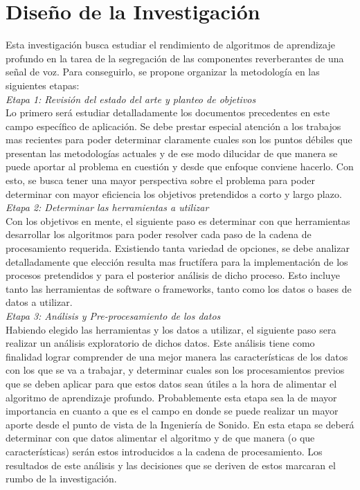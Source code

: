 \section{Diseño de la Investigación}
Esta investigación busca estudiar el rendimiento de algoritmos de aprendizaje profundo en la tarea de la segregación de las componentes reverberantes de una señal de voz. Para conseguirlo, se propone organizar la metodología en las siguientes etapas:\\

\textit{Etapa 1: Revisión del estado del arte y planteo de objetivos} \\
Lo primero será estudiar detalladamente los documentos precedentes en este campo específico de aplicación. Se debe prestar especial atención a los trabajos mas recientes para poder determinar claramente cuales son los puntos débiles que presentan las metodologías actuales y de ese modo dilucidar de que manera se puede aportar al problema en cuestión y desde que enfoque conviene hacerlo. Con esto, se busca tener una mayor perspectiva sobre el problema para poder determinar con mayor eficiencia los objetivos pretendidos a corto y largo plazo. \\

\textit{Etapa 2: Determinar las herramientas a utilizar} \\
Con los objetivos en mente, el siguiente paso es determinar con que herramientas desarrollar los algoritmos para poder resolver cada paso de la cadena de procesamiento requerida. Existiendo tanta variedad de opciones, se debe analizar detalladamente que elección resulta mas fructífera para la implementación de los procesos pretendidos y para el posterior análisis de dicho proceso. Esto incluye tanto las herramientas de software o frameworks, tanto como los datos o bases de datos a utilizar. \\

\textit{Etapa 3: Análisis y Pre-procesamiento de los datos} \\
Habiendo elegido las herramientas y los datos a utilizar, el siguiente paso sera realizar un análisis exploratorio de dichos datos. Este análisis tiene como finalidad lograr comprender de una mejor manera las características de los datos con los que se va a trabajar, y determinar cuales son los procesamientos previos que se deben aplicar para que estos datos sean útiles a la hora de alimentar el algoritmo de aprendizaje profundo. Probablemente esta etapa sea la de mayor importancia en cuanto a que es el campo en donde se puede realizar un mayor aporte desde el punto de vista de la Ingeniería de Sonido. En esta etapa se deberá determinar con que datos alimentar el algoritmo y de que manera (o que características) serán estos introducidos a la cadena de procesamiento. Los resultados de este análisis y las decisiones que se deriven de estos marcaran el rumbo de la investigación. \\

